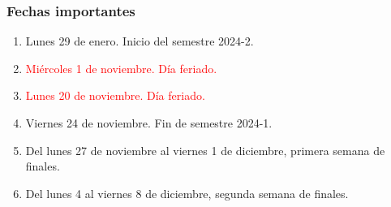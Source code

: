 \documentclass[12pt]{beamer}
\begin{document}
\begin{frame}
\frametitle{Fechas importantes}
\begin{enumerate}[<+->]
\item Lunes 29 de enero. Inicio del semestre 2024-2.
\item \textcolor{red}{Miércoles 1 de noviembre. Día feriado.}
\item \textcolor{red}{Lunes 20 de noviembre. Día feriado.}
\item Viernes 24 de noviembre. Fin de semestre 2024-1.
\item Del lunes 27 de noviembre al viernes 1 de diciembre, primera semana de finales.
\item Del lunes 4 al viernes 8 de diciembre, segunda semana de finales.
\end{enumerate}
\end{frame}
\end{document}
